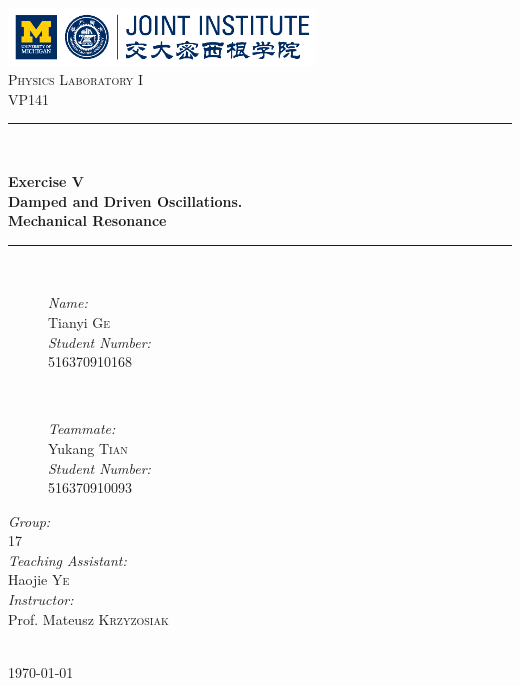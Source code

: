 \begin{titlepage}

\newcommand{\HRule}{\rule{\linewidth}{0.5mm}}

\center

\includegraphics[height=0.6in]{images/logo.png}\\[0.7cm]

\textsc{\Large Physics Laboratory I}\\[0.2cm]
\textsc{\large VP141}\\[0.2cm]

\HRule \\[0.4cm]
{
    \bfseries
    {\huge Exercise V}\\[0.3cm]
    {\large Damped and Driven Oscillations.\\ Mechanical Resonance}\\[0.1cm]
    \HRule \\[0.7cm]
}
\begin{figure}[h]
    \hspace{2.3cm}
    \begin{minipage}{0.4\textwidth}
        \large
        \emph{Name:}\\
        Tianyi \textsc{Ge} \\

        \emph{Student Number:}\\
        516370910168
    \end{minipage}
    ~
    \begin{minipage}{0.4\textwidth}
        \large
        \emph{Teammate:}\\
        Yukang \textsc{Tian} \\

        \emph{Student Number:}\\
        516370910093
    \end{minipage}
\end{figure}

\vspace{0.8cm}

\begin{minipage}{0.4\textwidth}
    \large
    \emph{Group:}\\
    17\\

    \emph{Teaching Assistant:}\\
    Haojie \textsc{Ye}\\

    \emph{Instructor:}\\
    Prof. Mateusz \textsc{Krzyzosiak}
\end{minipage}\\[2cm]

{\large \today}\\[2cm]

\vfill

\end{titlepage}

\tableofcontents
\clearpage